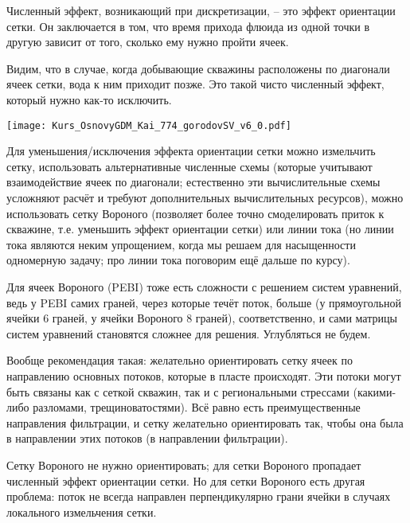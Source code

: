 Численный эффект, возникающий при дискретизации,  -- это эффект ориентации сетки.
Он заключается в том, что время прихода флюида из одной точки в другую зависит от того, сколько ему нужно пройти ячеек.

Видим, что в случае, когда добывающие скважины расположены по диагонали ячеек сетки, вода к ним приходит позже.
Это такой чисто численный эффект, который нужно как-то исключить. 

\texttt{[image: Kurs\_OsnovyGDM\_Kai\_774\_gorodovSV\_v6\_0.pdf]}

Для уменьшения/исключения эффекта ориентации сетки можно измельчить сетку, использовать альтернативные численные схемы (которые учитывают взаимодействие ячеек по диагонали; естественно эти вычислительные схемы усложняют расчёт и требуют дополнительных вычислительных ресурсов), можно использовать сетку Вороного (позволяет более точно смоделировать приток к скважине, т.е. уменьшить эффект ориентации сетки) или линии тока (но линии тока являются неким упрощением, когда мы решаем для насыщенности одномерную задачу; про линии тока поговорим ещё дальше по курсу).

Для ячеек Вороного (PEBI) тоже есть сложности с решением систем уравнений, ведь у PEBI самих граней, через которые течёт поток, больше (у прямоугольной ячейки 6 граней, у ячейки Вороного 8 граней), соответственно, и сами матрицы систем уравнений становятся сложнее для решения.
Углубляться не будем.

Вообще рекомендация такая: желательно ориентировать сетку ячеек по направлению основных потоков, которые в пласте происходят.
Эти потоки могут быть связаны как с сеткой скважин, так и с региональными стрессами (какими-либо разломами, трещиноватостями). Всё равно есть преимущественные направления фильтрации, и сетку желательно ориентировать так, чтобы она была в направлении этих потоков (в направлении фильтрации).

Сетку Вороного не нужно ориентировать; для сетки Вороного пропадает численный эффект ориентации сетки.
Но для сетки Вороного есть другая проблема: поток не всегда направлен перпендикулярно грани ячейки в случаях локального измельчения сетки.


